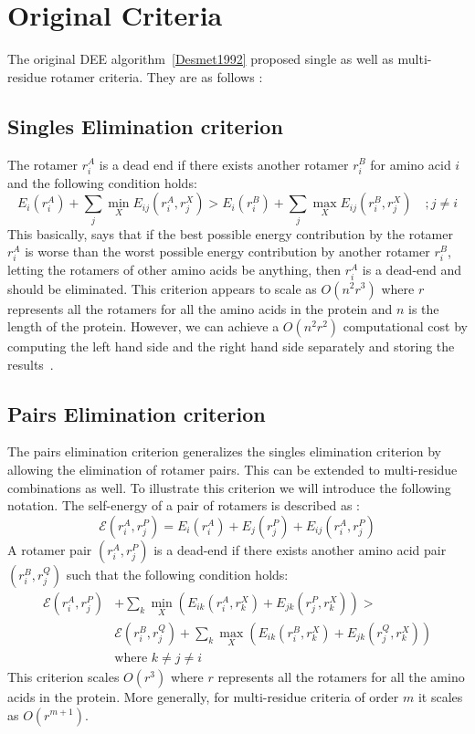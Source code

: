 \documentclass{article}
\begin{document}
\section{Original Criteria}
The original DEE algorithm~\ref{Desmet1992} proposed single as well as multi-residue rotamer criteria. They are as follows :

\subsection{Singles Elimination criterion}
The rotamer $r_i^A$ is a dead end if there exists another rotamer $r_i^B$ for amino acid $i$ and the following condition holds: 
\begin{equation}	
\label{Singles:criteria} 
E_i(r_i^A) + \sum_j \min_X E_{ij}(r_i^A,r_j^X) > E_i(r_i^B) + \sum_j \max_X E_{ij}(r_i^B,r_j^X) \quad   ; j\neq i
\end{equation}
This basically, says that if the best possible energy contribution by the rotamer $r_i^A$ is worse than the worst possible energy contribution by another rotamer $r_i^B$, letting the rotamers of other amino acids be anything, then $r_i^A$ is a dead-end and should be eliminated.
This criterion appears to scale as $O(n^2r^3)$ where $r$ represents all the rotamers for all the amino acids in the protein and $n$ is the length of the protein. However, we can achieve a $O(n^2r^2)$ computational cost by computing the left hand side and the right hand side separately and storing the results~\cite{Pierce2000}.

\subsection{Pairs Elimination criterion}
The pairs elimination criterion generalizes the singles elimination criterion by allowing the elimination of rotamer pairs. This can be extended to multi-residue combinations as well. To illustrate this criterion we will introduce the following notation. The self-energy of a pair of rotamers is described as : 
\[
\mathcal{E}(r_i^A,r_j^P) = E_i(r_i^A) + E_j(r_j^P) + E_{ij}(r_i^A,r_j^P)
\]
A rotamer pair $(r_i^A,r_j^P)$ is a dead-end if there exists another amino acid pair $(r_i^B,r_j^Q)$ such that the following condition holds:
\[
\begin{split}
\mathcal{E}(r_i^A,r_j^P) &+ \sum_k \min_X \left( E_{ik}(r_i^A,r_k^X) + E_{jk}(r_j^P,r_k^X) \right) > \\ & \mathcal{E}(r_i^B,r_j^Q) + \sum_k \max_X \left( E_{ik}(r_i^B,r_k^X) + E_{jk}(r_j^Q,r_k^X) \right) \\
& \text{where $k\neq j \neq i$}
\end{split}
\]
This criterion scales $O(r^3)$ where $r$ represents all the rotamers for all the amino acids in the protein. More generally, for multi-residue criteria of order $m$ it scales as $O(r^{m+1})$. 
\end{document}
